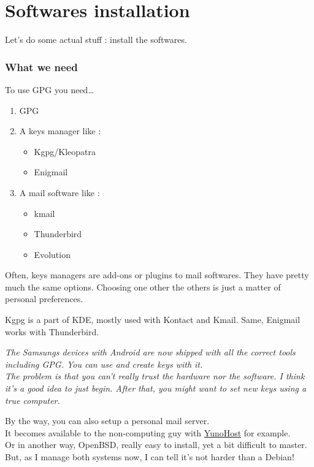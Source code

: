 \chapter{Softwares installation}

Let's do some actual stuff : install the softwares.

\subsection{What we need}\label{what-we-need}

To use GPG you need\ldots{}

\begin{enumerate}
\def\labelenumi{\arabic{enumi}.}
\itemsep1pt\parskip0pt
\item
  GPG
\item
  A keys manager like :

  \begin{itemize}
  \itemsep1pt\parskip0pt
  \item
    Kgpg/Kleopatra
  \item
    Enigmail
  \end{itemize}
\item
  A mail software like :

  \begin{itemize}
  \itemsep1pt\parskip0pt
  \item
    kmail
  \item
    Thunderbird
  \item
    Evolution
  \end{itemize}
\end{enumerate}

Often, keys managers are add-ons or plugins to mail softwares. They have
pretty much the same options. Choosing one other the others is just a
matter of personal preferences.

Kgpg is a part of KDE, mostly used with Kontact and Kmail. Same,
Enigmail works with Thunderbird.

\emph{The Samsungs devices with Android are now shipped with all the
correct tools including GPG. You can use and create keys with it.\\The
problem is that you can't really trust the hardware nor the software. I
think it's a good idea to just begin. After that, you might want to set
new keys using a true computer.}

By the way, you can also setup a personal mail server.\\It becomes
available to the non-computing guy with
\href{https://yunohost.org/}{YunoHost} for example.\\Or in another way,
OpenBSD, really easy to install, yet a bit difficult to master. But, as
I manage both systems now, I can tell it's not harder than a Debian!

